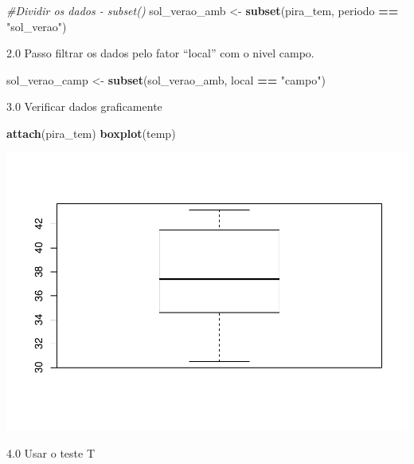 \documentclass[
]{book}
\newenvironment{Shaded}{\begin{snugshade}}{\end{snugshade}}
\newcommand{\CommentTok}[1]{\textcolor[rgb]{0.56,0.35,0.01}{\textit{#1}}}
\newcommand{\DataTypeTok}[1]{\textcolor[rgb]{0.13,0.29,0.53}{#1}}
\newcommand{\DecValTok}[1]{\textcolor[rgb]{0.00,0.00,0.81}{#1}}
\newcommand{\FloatTok}[1]{\textcolor[rgb]{0.00,0.00,0.81}{#1}}
\newcommand{\KeywordTok}[1]{\textcolor[rgb]{0.13,0.29,0.53}{\textbf{#1}}}
\newcommand{\NormalTok}[1]{#1}
\newcommand{\OperatorTok}[1]{\textcolor[rgb]{0.81,0.36,0.00}{\textbf{#1}}}
\newcommand{\StringTok}[1]{\textcolor[rgb]{0.31,0.60,0.02}{#1}}
\begin{document}
\begin{Shaded}
\begin{Highlighting}[]
 \CommentTok{#Dividir os dados - subset()}
\NormalTok{    sol_verao_amb <-}\StringTok{ }\KeywordTok{subset}\NormalTok{(pira_tem, periodo }\OperatorTok{==}\StringTok{ "sol_verao"}\NormalTok{)}
\end{Highlighting}
\end{Shaded}

2.0 Passo filtrar os dados pelo fator ``local'' com o nivel campo.

\begin{Shaded}
\begin{Highlighting}[]
\NormalTok{ sol_verao_camp <-}\StringTok{ }\KeywordTok{subset}\NormalTok{(sol_verao_amb, local }\OperatorTok{==}\StringTok{ "campo"}\NormalTok{)}
\end{Highlighting}
\end{Shaded}

3.0 Verificar dados graficamente

\begin{Shaded}
\begin{Highlighting}[]
\KeywordTok{attach}\NormalTok{(pira_tem)}
\KeywordTok{boxplot}\NormalTok{(temp)}
\end{Highlighting}
\end{Shaded}

\includegraphics{TudodoR_files/figure-latex/unnamed-chunk-250-1.pdf}

4.0 Usar o teste T

\begin{Shaded}
\end{Shaded}
\end{document}
